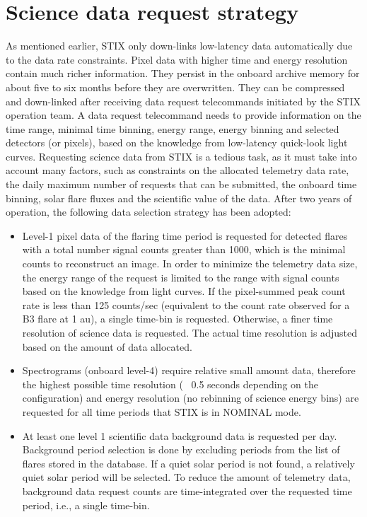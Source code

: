 \documentclass{aa}
\begin{document}
\section{Science data request strategy}
As mentioned earlier, STIX only down-links low-latency data 
automatically due to the data rate constraints.  
Pixel data with higher time and energy resolution contain much richer information. 
They persist in the onboard archive memory for about five to six months 
before they are overwritten.
They can be compressed and 
down-linked  after receiving data request telecommands initiated  by the STIX operation team. 
A data request telecommand needs to provide information on the
time range, minimal time binning, energy range, energy binning  and selected detectors (or pixels), based on 
the knowledge from low-latency quick-look light curves.
Requesting science data from STIX is a tedious task, as it must take
into account many factors, such as constraints on the  allocated telemetry data rate, 
the daily maximum number of requests that can be submitted,  
the onboard time binning, 
solar flare fluxes and the scientific value of the data. 
After two years of operation, the following data selection strategy has been adopted: 
\begin{itemize}
  \item 
  Level-1 pixel data 
  of the flaring time period is requested for detected flares with a total number signal counts  greater than 1000, 
  which is  the minimal counts to reconstruct an image.  
  In order to minimize the telemetry data size, 
  the energy range of the request is limited to the range with signal counts based on the 
  knowledge from light curves. 
  If the pixel-summed peak count rate is less than 125 counts/sec
  (equivalent to the count rate observed for a B3 flare at 1 au), 
  a single time-bin is requested. Otherwise, a finer time resolution of science data is requested.
  The actual time resolution is adjusted based on the amount of data allocated.
 \item Spectrograms (onboard level-4) require relative small amount data, therefore
  the highest possible time resolution (~ 0.5 seconds depending on the configuration)
   and energy resolution  (no rebinning of science energy bins) are requested for all time periods that STIX is in NOMINAL mode. 
\item At least one level 1 scientific data background data is requested per day. 
Background period selection is done by excluding periods from the list of flares stored in the database. 
If a quiet solar period is not found, a relatively quiet solar period will be selected. 
To reduce the amount of telemetry data, 
background data request counts are time-integrated over the requested time period, i.e., a single time-bin.
\end{itemize}
\end{document}
